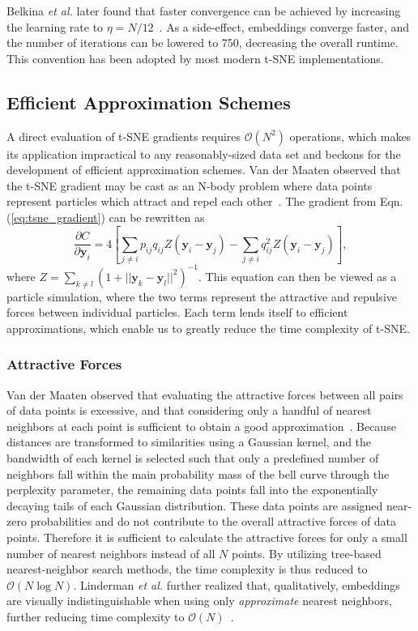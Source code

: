 \documentclass[twocolumn]{bmcart}
\begin{document}
Belkina \textit{et al.} later found that faster convergence can be achieved by
increasing the learning rate to $\eta=N/12$~\cite{belkina2019automated}. As a
side-effect, embeddings converge faster, and the number of iterations can be
lowered to 750, decreasing the overall runtime.  This convention has been
adopted by most modern t-SNE implementations.

\subsection*{Efficient Approximation Schemes} A direct evaluation of t-SNE
gradients requires $\mathcal{O}(N^2)$ operations, which makes its application
impractical to any reasonably-sized data set and beckons for the development of
efficient approximation schemes. Van der Maaten observed that the t-SNE gradient
may be cast as an N-body problem where data points represent particles which
attract and repel each other~\cite{van2014accelerating}. The gradient from Eqn.
(\ref{eq:tsne_gradient}) can be rewritten as
\begin{equation}
\frac{\partial C}{\partial \mathbf{y}_i} = 4 \left [ \sum_{j \neq i} p_{ij} q_{ij} Z \left ( \mathbf{y}_i - \mathbf{y}_j \right ) -\sum_{j \neq i} q_{ij}^2 Z \left ( \mathbf{y}_i - \mathbf{y}_j \right ) \right ], \label{eq:grad_attr_rep}
\end{equation}
where $Z = \sum_{k \neq l}\left ( 1 + || \mathbf{y}_k - \mathbf{y}_l ||^2 \right
)^{-1}$. This equation can then be viewed as a particle simulation, where the
two terms represent the attractive and repulsive forces between individual
particles. Each term lends itself to efficient approximations, which enable us
to greatly reduce the time complexity of t-SNE.

\subsubsection*{Attractive Forces}

Van der Maaten observed that evaluating the attractive forces between all pairs
of data points is excessive, and that considering only a handful of nearest
neighbors at each point is sufficient to obtain a good
approximation~\cite{van2014accelerating}.  Because distances are transformed to
similarities using a Gaussian kernel, and the bandwidth of each kernel is
selected such that only a predefined number of neighbors fall within the main
probability mass of the bell curve through the perplexity parameter, the
remaining data points fall into the exponentially decaying tails of each
Gaussian distribution.  These data points are assigned near-zero probabilities
and do not contribute to the overall attractive forces of data points.
Therefore it is sufficient to calculate the attractive forces for only a small
number of nearest neighbors instead of all $N$ points. By utilizing tree-based
nearest-neighbor search methods, the time complexity is thus reduced to
$\mathcal{O}(N \log N)$. Linderman \textit{et al.} further realized that,
qualitatively, embeddings are visually indistinguishable when using only
\textit{approximate} nearest neighbors, further reducing time complexity to
$\mathcal{O}(N)$~\cite{linderman2019fast}.
\end{document}
